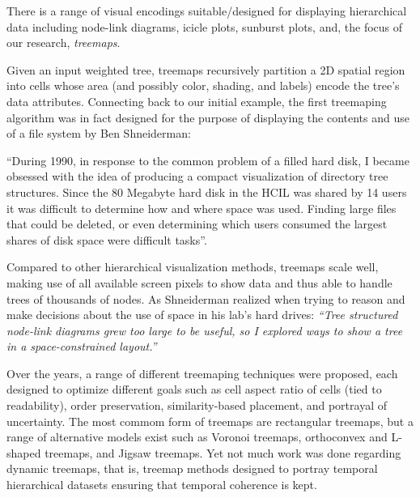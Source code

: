 There is a range of visual encodings suitable/designed for displaying hierarchical data including node-link diagrams, icicle plots, sunburst plots, and, the focus of our research, \emph{treemaps}.

Given an input weighted tree, treemaps recursively partition a 2D spatial region into cells whose area (and possibly color, shading, and labels) encode the tree’s data attributes. 
Connecting back to our initial example, the first treemaping algorithm was in fact designed for the purpose of displaying the contents and use of a file system by Ben Shneiderman:

\begin{quoting}
    ``During 1990, in response to the common problem of a filled hard disk, I became obsessed with the idea of producing a compact visualization of directory tree structures. Since the 80 Megabyte hard disk in the HCIL was shared by 14 users it was difficult to determine how and where space was used. Finding large files that could be deleted, or even determining which users consumed the largest shares of disk space were difficult tasks''.
\end{quoting}

Compared to other hierarchical visualization methods, treemaps scale well, making use of all available screen pixels to show data and thus able to handle trees of thousands of nodes. As Shneiderman realized when trying to reason and make decisions about the use of space in his lab's hard drives:
\textit{``Tree structured node-link diagrams grew too large to be useful, so I explored ways to show a tree in a space-constrained layout.''}

Over the years, a range of different treemaping techniques were proposed, each designed to optimize different goals such as cell aspect ratio of cells (tied to readability), order preservation, similarity-based placement, and portrayal of uncertainty. The most commom form of treemaps are rectangular treemaps, but a range of alternative models exist such as Voronoi treemaps, orthoconvex and L-shaped treemaps, and Jigsaw treemaps.
Yet not much work was done regarding dynamic treemaps, that is, treemap methods designed to portray temporal hierarchical datasets ensuring that temporal coherence is kept.


